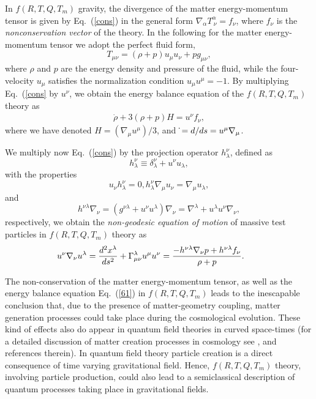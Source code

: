 \documentclass[aps,superscriptaddress, showpacs,preprintnumbers, superscriptaddress, nofootinbibt,twocolumn]{revtex4}
\def\be{\begin{equation}}
\def\ee{\end{equation}}
\begin{document}
In $f\left(R,T,Q,T_m\right)$ gravity, the divergence of the matter energy-momentum tensor is given by Eq.~(\ref{cons}) in the general form  $\nabla_\alpha T^\alpha_{~\nu}=f_{\nu}$, where $f_{\nu}$ is the {\it nonconservation vector} of the theory. In the following for the matter energy-momentum tensor we adopt the perfect fluid form,
\be
T_{\mu\nu}=(\rho+p)u_{\mu}u_{\nu}+pg_{\mu \nu},
\ee
where $\rho $ and $p$ are the energy density and pressure of the fluid, while the four-velocity $u_{\mu}$ satisfies the normalization condition $u_{\mu}u^{\mu}=-1$. By multiplying Eq.~(\ref{cons} by $u^\nu$,  we obtain the  energy balance equation of the $f(R,T,Q,T_m)$ theory as
\begin{eqnarray}\label{61}
\dot{\rho}+3(\rho + p) H =u^{\nu}f_{\nu},
\end{eqnarray}
where we have denoted $H = \left( \nabla_{\mu} u^{\mu} \right)/3$, and $\dot{%
} = d/ds = u^{\mu } \nabla_{\mu }$.

We multiply now Eq.~(\ref{cons}) by the projection operator $h_{
 \lambda}^\nu$, defined as
 \be
 h_{ \lambda}^\nu \equiv
\delta_{\lambda}^\nu + u^\nu u_\lambda,
\ee
 with the properties
 \be
 u_{\nu} h_{\lambda}^{\nu} = 0, h_{\lambda}^{\nu} \nabla_{\mu} u_{\nu} = \nabla_{\mu} u_{\lambda},
\ee
and
\be
h^{\nu \lambda}
\nabla_\nu = \left( g^{\nu\lambda} + u^\nu u^\lambda \right) \nabla_\nu =
\nabla ^\lambda + u^\lambda u^{\nu} \nabla_{\nu},
\ee
respectively, we obtain the
{\it non-geodesic equation of motion} of massive test particles in $f\left(R,T,Q,T_m\right)$ theory as
\begin{eqnarray}\label{force0}
\hspace{-0.7cm}u^{\nu} \nabla_{\nu} u^{\lambda} =\frac{d^2x^{\lambda}}{d%
s^2}+\Gamma_{\mu \nu}^{\lambda }u^{\mu }u^{\nu} = \frac{- h^{\nu \lambda}
\nabla_{\nu} p + h^{\nu \lambda} f_{\nu}}{\rho + p}.
\end{eqnarray}

The non-conservation of the matter energy-momentum tensor, as well as the energy balance equation Eq.~(\ref{61}) in $f(R,T,Q,T_m)$  leads to the inescapable conclusion that, due to the presence of matter-geometry coupling, matter generation processes could
take place during the cosmological evolution. These kind of effects also
do appear in quantum field theories in curved space-times (for a detailed discussion of matter creation processes in cosmology see \cite{book}, and references therein). In quantum field theory particle creation is a direct consequence of time varying
gravitational field. Hence, $f\left(R,T,Q,T_m\right)$ theory, involving particle production, could also lead to a semiclassical description of
quantum processes taking place in gravitational fields.
\end{document}
